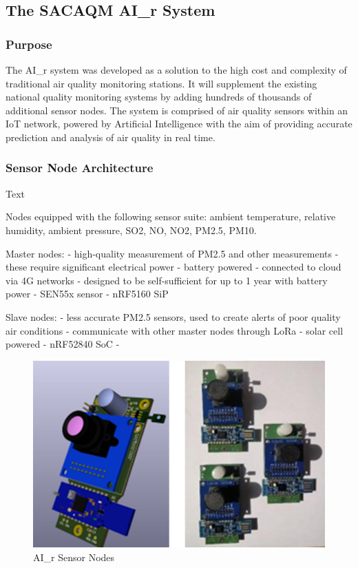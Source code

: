 \documentclass[a4paper,twoside,12pt]{report}
\begin{document}
\subsection{The SACAQM AI\_r System}
\subsubsection{Purpose}
The AI\_r system was developed as a solution to the high cost and complexity of traditional air quality monitoring stations\citep{SACAQM}. It will supplement the existing national quality monitoring systems by adding hundreds of thousands of additional sensor nodes. The system is comprised of air quality sensors within an IoT network, powered by Artificial Intelligence with the aim of providing accurate prediction and analysis of air quality in real time\citep{SACAQM}.

\subsubsection{Sensor Node Architecture}
Text

Nodes equipped with the following sensor suite: ambient temperature, relative humidity, ambient pressure, SO2, NO, NO2, PM2.5, PM10.

Master nodes: 
- high-quality measurement of PM2.5 and other measurements
- these require significant electrical power - battery powered
- connected to cloud via 4G networks
- designed to be self-sufficient for up to 1 year with battery power
- SEN55x sensor
- nRF5160 SiP

Slave nodes:
- less accurate PM2.5 sensors, used to create alerts of poor quality air conditions
- communicate with other master nodes through LoRa
- solar cell powered
- nRF52840 SoC
- 

\begin{figure}[ht]
	\centering
	\includegraphics[width=0.6\linewidth]{images/SensorNodes.png}
	\caption{AI\_r Sensor Nodes}
	\label{fig:SensorNodes}
\end{figure}
\end{document}
